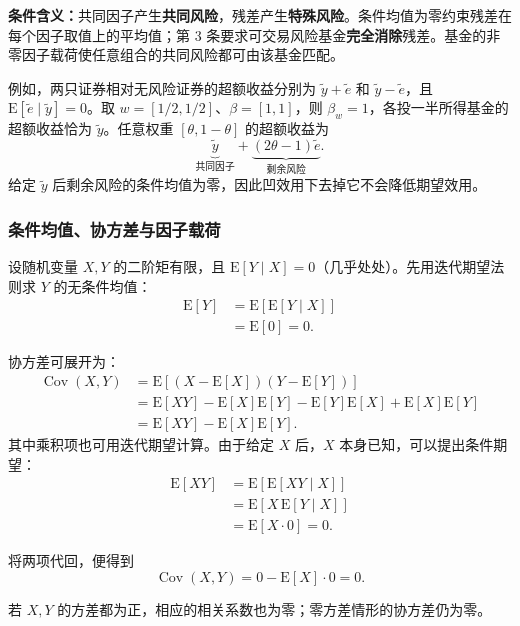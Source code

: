 \textbf{条件含义：}共同因子产生\textbf{共同风险}，残差产生\textbf{特殊风险}。条件均值为零约束残差在每个因子取值上的平均值；第 3 条要求可交易风险基金\textbf{完全消除}残差。基金的非零因子载荷使任意组合的共同风险都可由该基金匹配。

例如，两只证券相对无风险证券的超额收益分别为 $\tilde y+\tilde e$ 和 $\tilde y-\tilde e$，且 $\mathrm E[\tilde e\mid\tilde y]=0$。取 $w=[1/2,1/2]$、$\beta=[1,1]$，则 $\beta_w=1$，各投一半所得基金的超额收益恰为 $\tilde y$。任意权重 $[\theta,1-\theta]$ 的超额收益为
\[
 \underbrace{\tilde y}_{\text{共同因子}}
 +\underbrace{(2\theta-1)\tilde e}_{\text{剩余风险}}.
\]
给定 $\tilde y$ 后剩余风险的条件均值为零，因此凹效用下去掉它不会降低期望效用。

\subsubsection{条件均值、协方差与因子载荷}
设随机变量 $X,Y$ 的二阶矩有限，且 $\mathrm E[Y\mid X]=0$（几乎处处）。先用迭代期望法则求 $Y$ 的无条件均值：
\[
\begin{aligned}
 \mathrm E[Y]
 &=\mathrm E\!\left[\mathrm E[Y\mid X]\right]\\
 &=\mathrm E[0]=0.
\end{aligned}
\]

协方差可展开为：
\[
\begin{aligned}
 \operatorname{Cov}(X,Y)
 &=\mathrm E\!\left[(X-\mathrm E[X])(Y-\mathrm E[Y])\right]\\
 &=\mathrm E[XY]-\mathrm E[X]\mathrm E[Y]
   -\mathrm E[Y]\mathrm E[X]+\mathrm E[X]\mathrm E[Y]\\
 &=\mathrm E[XY]-\mathrm E[X]\mathrm E[Y].
\end{aligned}
\]
其中乘积项也可用迭代期望计算。由于给定 $X$ 后，$X$ 本身已知，可以提出条件期望：
\[
\begin{aligned}
 \mathrm E[XY]
 &=\mathrm E\!\left[\mathrm E[XY\mid X]\right]\\
 &=\mathrm E\!\left[X\,\mathrm E[Y\mid X]\right]\\
 &=\mathrm E[X\cdot0]=0.
\end{aligned}
\]

将两项代回，便得到
\[
 \boxed{\operatorname{Cov}(X,Y)=0-\mathrm E[X]\cdot0=0.}
\]

若 $X,Y$ 的方差都为正，相应的相关系数也为零；零方差情形的协方差仍为零。

